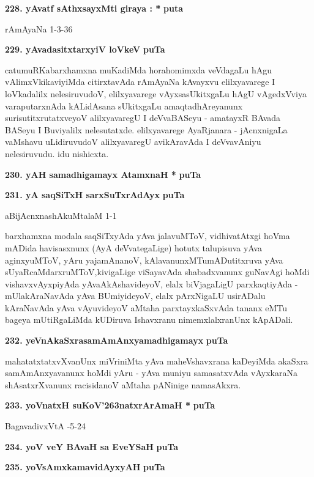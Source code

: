 \medskip
\noindent
\textbf{228. yAvatf sAthxsayxMti giraya : *} \hfill{\bf puta \pageref{77}}

\hfill{rAmAyaNa 1-3-36}

\medskip
\noindent
\textbf{229. yAvadasitxtarxyiV loVkeV} \hfill{\bf puTa \pageref{20}}

\smallskip
catumuRKabarxhamxna muKadiMda horahomimxda veVdagaLu hAgu vAlimxVki\-kaviyiMda citirxtavAda rAmAyaNa kAvayxvu elilxyavarege I loVkadalilx nelesiruvudoV, elilxyavarege vAyxsasUkitxgaLu hAgU vAgedxVviya varaputarxnAda kALidAsana sUkitxgaLu amaqtadhAreyanunx surisutitxrutatxveyoV alilxyava\-regU I deVvaBASeyu - amatayxR BAvada BASeyu I Buviyalilx nelesutatxde. elilxyavarege AyaR\-janara - jAcnxnigaLa vaMshavu uLidiruvudoV alilxyavaregU avikAravAda I deVvavAniyu nelesiru\-vudu. idu nishicxta.

\medskip
\noindent
\textbf{230. yAH samadhigamayx AtamxnaH *} \hfill{\bf puTa \pageref{94}}

\medskip
\noindent
\textbf{231. yA saqSiTxH sarxSuTxrAdAyx} \hfill{\bf puTa \pageref{243}}

\hfill{aBijAcnxnashAkuMtalaM 1-1}

\smallskip
barxhamxna modala saqSiTxyAda yAva jalavuMToV, vidhivatAtxgi hoVma \hbox{mADida} havisasxnunx (AyA deVvategaLige) hotutx talupisuva yAva aginxyuMToV, yAru yajamAnanoV, kAlavanunxMTu\-mADutitxruva yAva sUyaRcaMdarxruMToV,\break kivigaLige viSayavAda shabadxvanunx guNavAgi hoMdi vishavxvAyxpiyAda yAva\break AkAshavideyoV, elalx biVjagaLigU parxkaqtiyAda - mUlakAraNavAda yAva BUmiyideyoV, elalx pArxNigaLU usirADalu kAraNavAda yAva vAyu\-videyoV aMtaha parxtayxkaSx\-vAda tananx eMTu bageya mUtiRgaLiMda kUDiruva Ishavxranu nimemxlalxranUnx kApADali.

\medskip
\noindent
\textbf{232. yeVnAkaSxrasamAmAnxyamadhigamayx} \hfill{\bf puTa \pageref{157}}

\smallskip
mahatatxtatxvXvanUnx miVriniMta yAva maheVshavxrana kaDeyiMda akaSxra samA\-mAnxyavanunx hoMdi yAru - yAva muniyu samasatxvAda vAyxkaraNa shAsatxrX\-vanunx racisidanoV aMtaha pANinige namasAkxra.

\medskip
\noindent
\textbf{233. yoVnatxH suKoV\char'263natxrArAmaH *} \hfill{\bf puTa \pageref{134}}

\hfill{BagavadivxVtA -5-24}

\medskip
\noindent
\textbf{234. yoV veY BAvaH sa EveYSaH} \hfill{\bf puTa \pageref{227}}

\medskip
\noindent
\textbf{235. yoVsAmxkamavidAyxyAH} \hfill{\bf puTa \pageref{103}}

